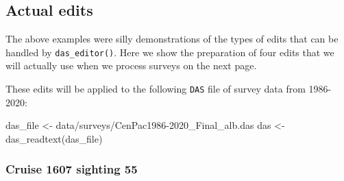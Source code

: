 \documentclass[
]{book}
\newenvironment{Shaded}{\begin{snugshade}}{\end{snugshade}}
\newcommand{\AttributeTok}[1]{\textcolor[rgb]{0.77,0.63,0.00}{#1}}
\newcommand{\CommentTok}[1]{\textcolor[rgb]{0.56,0.35,0.01}{\textit{#1}}}
\newcommand{\DecValTok}[1]{\textcolor[rgb]{0.00,0.00,0.81}{#1}}
\newcommand{\FunctionTok}[1]{\textcolor[rgb]{0.00,0.00,0.00}{#1}}
\newcommand{\NormalTok}[1]{#1}
\newcommand{\OtherTok}[1]{\textcolor[rgb]{0.56,0.35,0.01}{#1}}
\newcommand{\SpecialCharTok}[1]{\textcolor[rgb]{0.00,0.00,0.00}{#1}}
\newcommand{\StringTok}[1]{\textcolor[rgb]{0.31,0.60,0.02}{#1}}
\begin{document}
\begin{Shaded}
\end{Shaded}

\hypertarget{actual-edits}{%
\subsection*{Actual edits}\label{actual-edits}}

The above examples were silly demonstrations of the types of edits that can be handled by \texttt{das\_editor()}. Here we show the preparation of four edits that we will actually use when we process surveys on the next page.

These edits will be applied to the following \texttt{DAS} file of survey data from 1986-2020:

\begin{Shaded}
\begin{Highlighting}[]
\NormalTok{das\_file }\OtherTok{\textless{}{-}} \StringTok{\textquotesingle{}data/surveys/CenPac1986{-}2020\_Final\_alb.das\textquotesingle{}}
\NormalTok{das }\OtherTok{\textless{}{-}} \FunctionTok{das\_readtext}\NormalTok{(das\_file)}
\end{Highlighting}
\end{Shaded}

\hypertarget{cruise-1607-sighting-55}{%
\subsubsection*{Cruise 1607 sighting 55}\label{cruise-1607-sighting-55}}
\end{document}
